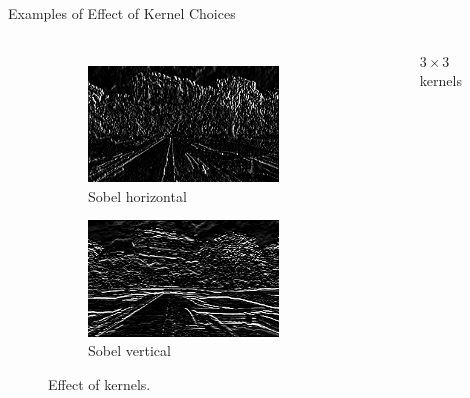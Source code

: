 \begin{frame}{Examples of Effect of Kernel Choices}
\begin{columns}[t]
\begin{figure}
\begin{subfigure}[b]{0.45\textwidth}
                \includegraphics[width=\textwidth]{./figures/sigiriya_sobel_horizontal.jpg}
                \caption{Sobel horizontal}
                \label{sfi:sigiriya_sobel_horizontal}
            \end{subfigure}
            \hspace{0.2cm}
            \begin{subfigure}[b]{0.45\textwidth}
                \includegraphics[width=\textwidth]{./figures/sigiriya_sobel_vertical.jpg}
                \caption{Sobel vertical}
                \label{sfi:sigiriya_averaged}
            \end{subfigure}
            \caption{Effect of kernels.}\label{fi:effect_of_kernels}
        \end{figure}
        \begin{figure}
            \centering
            
            \caption{$3\times 3$ kernels}
            \label{fi:kernels}
        \end{figure}
    \end{columns}

\end{frame}

